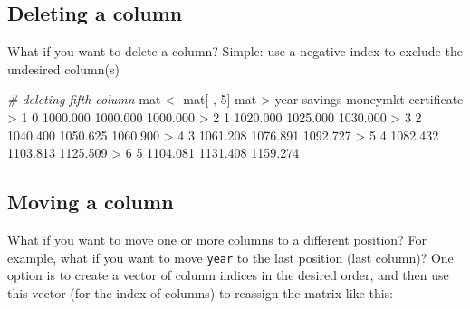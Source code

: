 \documentclass[
]{book}
\newenvironment{Shaded}{\begin{snugshade}}{\end{snugshade}}
\newcommand{\CommentTok}[1]{\textcolor[rgb]{0.56,0.35,0.01}{\textit{#1}}}
\newcommand{\DecValTok}[1]{\textcolor[rgb]{0.00,0.00,0.81}{#1}}
\newcommand{\FloatTok}[1]{\textcolor[rgb]{0.00,0.00,0.81}{#1}}
\newcommand{\NormalTok}[1]{#1}
\newcommand{\OtherTok}[1]{\textcolor[rgb]{0.56,0.35,0.01}{#1}}
\newcommand{\SpecialCharTok}[1]{\textcolor[rgb]{0.00,0.00,0.00}{#1}}
\begin{document}
\hypertarget{deleting-a-column}{%
\subsection{Deleting a column}\label{deleting-a-column}}

What if you want to delete a column? Simple: use a negative index to exclude
the undesired column(s)

\begin{Shaded}
\begin{Highlighting}[]
\CommentTok{\# deleting fifth column}
\NormalTok{mat }\OtherTok{\textless{}{-}}\NormalTok{ mat[ ,}\SpecialCharTok{{-}}\DecValTok{5}\NormalTok{]}
\NormalTok{mat}
\SpecialCharTok{\textgreater{}}\NormalTok{   year  savings moneymkt certificate}
\SpecialCharTok{\textgreater{}} \DecValTok{1}    \DecValTok{0} \FloatTok{1000.000} \FloatTok{1000.000}    \FloatTok{1000.000}
\SpecialCharTok{\textgreater{}} \DecValTok{2}    \DecValTok{1} \FloatTok{1020.000} \FloatTok{1025.000}    \FloatTok{1030.000}
\SpecialCharTok{\textgreater{}} \DecValTok{3}    \DecValTok{2} \FloatTok{1040.400} \FloatTok{1050.625}    \FloatTok{1060.900}
\SpecialCharTok{\textgreater{}} \DecValTok{4}    \DecValTok{3} \FloatTok{1061.208} \FloatTok{1076.891}    \FloatTok{1092.727}
\SpecialCharTok{\textgreater{}} \DecValTok{5}    \DecValTok{4} \FloatTok{1082.432} \FloatTok{1103.813}    \FloatTok{1125.509}
\SpecialCharTok{\textgreater{}} \DecValTok{6}    \DecValTok{5} \FloatTok{1104.081} \FloatTok{1131.408}    \FloatTok{1159.274}
\end{Highlighting}
\end{Shaded}

\hypertarget{moving-a-column}{%
\subsection{Moving a column}\label{moving-a-column}}

What if you want to move one or more columns to a different position? For
example, what if you want to move \texttt{year} to the last position (last column)?
One option is to create a vector of column indices in the desired order, and then
use this vector (for the index of columns) to reassign the matrix like this:
\end{document}
